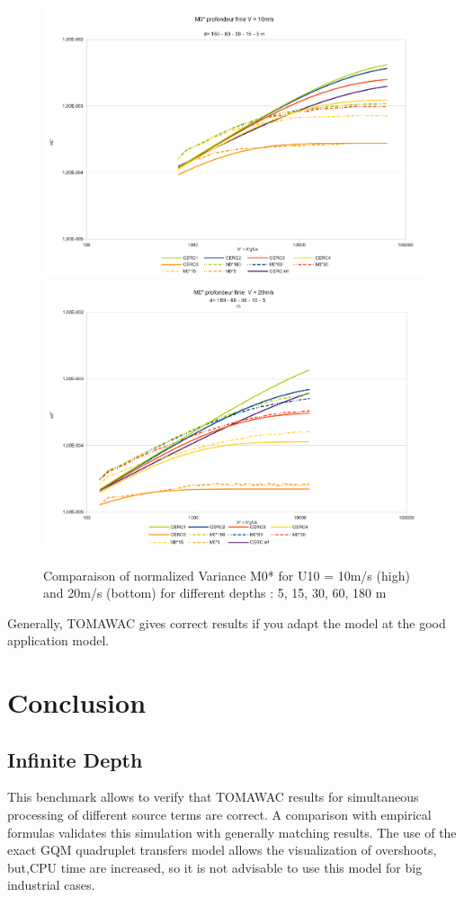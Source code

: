 \documentclass[10pt]{article}
\begin{document}
\begin{figure}
\centering
\includegraphics[scale=0.4]{m0_test7v10.pdf}\\
\includegraphics[scale=0.4]{m0_test7v20.pdf}\\
\caption{Comparaison of normalized Variance M0* for U10 = 10m/s (high) and 20m/s (bottom) for different depths : 5, 15, 30, 60, 180 m}
\end{figure}
Generally, TOMAWAC gives correct results if you adapt the model at the good application model. 
\section{Conclusion}
\subsection*{Infinite Depth}
This benchmark allows to verify that TOMAWAC results for simultaneous processing of different source terms are correct. A comparison with empirical formulas validates this simulation with generally matching results. The use of the exact GQM quadruplet transfers model allows the visualization of overshoots, but,CPU time are increased, so it is not advisable to use this model for big industrial cases.
\end{document}
